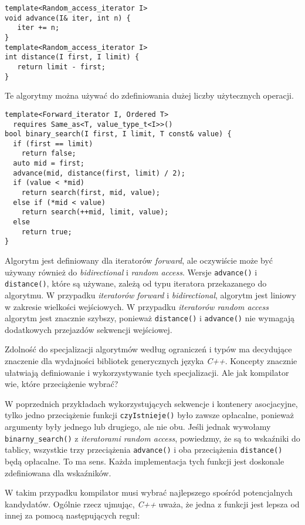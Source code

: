 \documentclass[11pt, a4paper]{article}
\begin{document}
\begin{lstlisting}[frame=single]
template<Random_access_iterator I>
void advance(I& iter, int n) {
   iter += n;
}
template<Random_access_iterator I>
int distance(I first, I limit) {
   return limit - first;
}
\end{lstlisting}

Te algorytmy można używać do zdefiniowania dużej liczby użytecznych operacji.

\begin{lstlisting}[frame=single]
template<Forward_iterator I, Ordered T>
  requires Same_as<T, value_type_t<I>>()
bool binary_search(I first, I limit, T const& value) {
  if (first == limit)
    return false;
  auto mid = first;
  advance(mid, distance(first, limit) / 2);
  if (value < *mid)
    return search(first, mid, value);
  else if (*mid < value)
    return search(++mid, limit, value);
  else
    return true;
}

\end{lstlisting}

Algorytm jest definiowany dla iteratorów \emph{forward}, ale oczywiście może być używany również do \emph{bidirectional} i \emph{random access}. Wersje \verb#advance()# i \verb#distance()#, które są używane, zależą od typu iteratora przekazanego do algorytmu. W przypadku \emph{iteratorów forward} i \emph{bidirectional}, algorytm jest liniowy w zakresie wielkości wejściowych. W przypadku \emph{iteratorów random access} algorytm jest znacznie szybszy, ponieważ \verb#distance()# i \verb#advance()# nie wymagają dodatkowych przejazdów sekwencji wejściowej.

Zdolność do specjalizacji algorytmów według ograniczeń i typów ma decydujące znaczenie dla wydajności bibliotek generycznych języka \emph{C++}. Koncepty znacznie ułatwiają definiowanie i wykorzystywanie tych specjalizacji. Ale jak kompilator wie, które przeciążenie wybrać?

W poprzednich przykładach wykorzystujących sekwencje i kontenery asocjacyjne, tylko jedno przeciążenie funkcji \verb#czyIstnieje()# było zawsze opłacalne, ponieważ argumenty były jednego lub drugiego, ale nie obu. Jeśli jednak wywołamy \verb#binarny_search()# z \emph{iteratorami random access}, powiedzmy, że są to wskaźniki do tablicy, wszystkie trzy przeciążenia \verb#advance()# i oba przeciążenia \verb#distance()# będą opłacalne. To ma sens. Każda implementacja tych funkcji jest doskonale zdefiniowana dla wskaźników.

W takim przypadku kompilator musi wybrać najlepszego spośród potencjalnych kandydatów. Ogólnie rzecz ujmując, \emph{C++} uważa, że jedna z funkcji jest lepsza od innej za pomocą następujących reguł:
\end{document}
